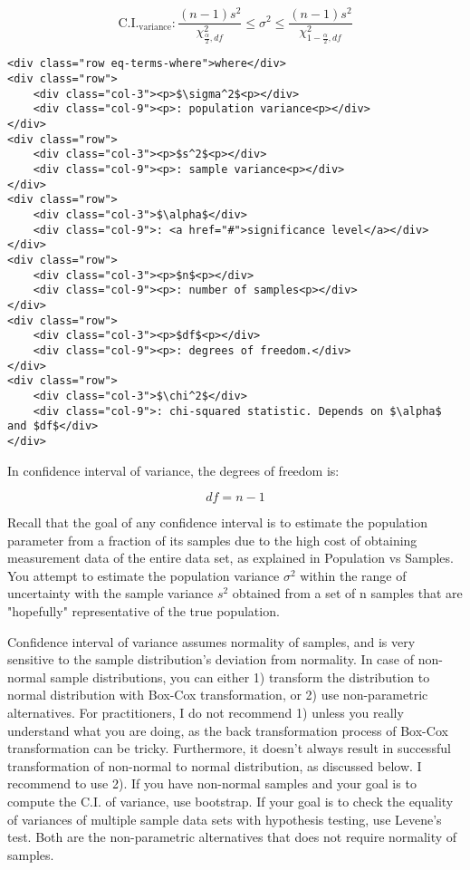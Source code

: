 \documentclass[11pt]{article}
\begin{document}
    \hypertarget{eq-10}{}
\[  \text{C.I.}_{\text{variance}}: \frac{(n-1)s^{2}}{\chi^{2}_{\frac{\alpha}{2}, df}} \leq \sigma^2 \leq \frac{(n-1)s^{2}}{\chi^{2}_{1-\frac{\alpha}{2}, df}} \tag{10}\]

\begin{verbatim}
<div class="row eq-terms-where">where</div>
<div class="row">
    <div class="col-3"><p>$\sigma^2$<p></div>
    <div class="col-9"><p>: population variance<p></div>
</div>
<div class="row">
    <div class="col-3"><p>$s^2$<p></div>
    <div class="col-9"><p>: sample variance<p></div>
</div>    
<div class="row">
    <div class="col-3">$\alpha$</div>
    <div class="col-9">: <a href="#">significance level</a></div>
</div>    
<div class="row">
    <div class="col-3"><p>$n$<p></div>
    <div class="col-9"><p>: number of samples<p></div>
</div>
<div class="row">
    <div class="col-3"><p>$df$<p></div>
    <div class="col-9"><p>: degrees of freedom.</div>
</div>    
<div class="row">
    <div class="col-3">$\chi^2$</div>
    <div class="col-9">: chi-squared statistic. Depends on $\alpha$ and $df$</div>
</div>   
\end{verbatim}

In confidence interval of variance, the degrees of freedom is:

\hypertarget{eq-11}{}
\[df = n - 1\]

Recall that the goal of any confidence interval is to estimate the
population parameter from a fraction of its samples due to the high cost
of obtaining measurement data of the entire data set, as explained in
Population vs Samples. You attempt to estimate the population variance
{\(\sigma^2\)} within the range of uncertainty with the sample variance
{\(s^2\)} obtained from a set of {n} samples that are "hopefully"
representative of the true population.

Confidence interval of variance assumes normality of samples, and is
very sensitive to the sample distribution's deviation from normality. In
case of non-normal sample distributions, you can either 1) transform the
distribution to normal distribution with Box-Cox transformation, or 2)
use non-parametric alternatives. For practitioners, I do not recommend
1) unless you really understand what you are doing, as the back
transformation process of Box-Cox transformation can be tricky.
Furthermore, it doesn't always result in successful transformation of
non-normal to normal distribution, as discussed below. I recommend to
use 2). If you have non-normal samples and your goal is to compute the
C.I. of variance, use bootstrap. If your goal is to check the equality
of variances of multiple sample data sets with hypothesis testing, use
Levene's test. Both are the non-parametric alternatives that does not
require normality of samples.
\end{document}
